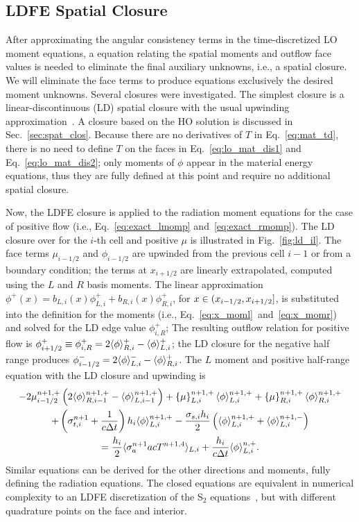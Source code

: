 \subsection{LDFE Spatial Closure}

After approximating the angular consistency terms in the time-discretized LO moment equations, 
a equation relating the spatial moments and outflow face values is
needed to eliminate the final auxiliary unknowns, i.e., a spatial closure.
We will eliminate the face terms to produce equations exclusively the desired moment
unknowns.  Several closures were investigated.  The simplest closure
is a linear-discontinuous (LD) spatial closure with the usual upwinding
approximation~\cite{morel_ldtrt}.  A closure based on the HO solution is discussed in
Sec.~\ref{sec:spat_clos}.  Because there are no derivatives of $T$ in Eq.~\eqref{eq:mat_td}, there is no need
to define $T$ on the faces in Eq.~\eqref{eq:lo_mat_dis1} and Eq.~\eqref{eq:lo_mat_dis2};
only moments of $\phi$ appear in the material energy
equations, thus they are fully defined at this point and require no additional spatial
closure.  

Now, the LDFE closure is applied to the radiation moment equations for the case of
positive flow (i.e., Eq.~\eqref{eq:exact_lmomp} and~\eqref{eq:exact_rmomp}). The LD
closure over for the $i$-th cell and positive $\mu$ 
is illustrated in Fig.~\ref{fig:ld_il}.  The face terms $\mu_{i-1/2}$ and $\phi_{i-1/2}$
are upwinded from the previous cell $i-1$ or from a boundary condition; the terms
at $x_{i+1/2}$ are linearly extrapolated, computed using the $L$ and $R$ basis
moments.  The linear approximation $\phi^+(x)=b_{L,i}(x)\phi^+_{L,i} +
b_{R,i}(x)\phi^+_{R,i}$, for $x\in({x_{i-1/2}},{x_{i+1/2}}]$, is substituted into the definition for
the moments (i.e., Eq.~\eqref{eq:x_moml}~and~\eqref{eq:x_momr}) and solved for the LD edge value
$\phi_{i,R}^+$; The resulting outflow relation for positive flow is $\phi^+_{i+1/2} \equiv \phi_{i,R}^+ = 2\langle \phi \rangle_{R,i}^+ -
\langle \phi \rangle_{L,i}^+$; the LD closure for the negative half range produces $\phi^-_{i-1/2} = 2\langle \phi \rangle_{L,i}^- -
\langle \phi \rangle_{R,i}^+$. The $L$ moment and positive half-range equation with the LD closure and upwinding is
\begin{multline} 
    -2{\mu}_{i-1/2}^{n+1,+} \left(2\langle \phi \rangle_{R,i-1}^{n+1,+} -   \langle \phi \rangle_{L,i-1}^{n+1,+}      \right) + \left\{ \mu \right\}_{L,i}^{n+1,+}
  \langle \phi \rangle_{L,i}^{n+1,+}
  +  \left\{ \mu \right\}_{R,i}^{n+1,+}
  \langle \phi \rangle_{R,i}^{n+1,+}\\ +  \left(\sigma_{t,i}^{n+1}+\frac{1}{c \Delta t} \right) h_i 
  \langle \phi \rangle_{L,i}^{n+1,+} -  \frac{\sigma_{s,i} h_i}{2} \left( \langle \phi \rangle_{L,i}^{n+1,+} +
  \langle \phi \rangle_{L,i}^{n+1,-}\right)\\  = \frac{h_i}{2} \langle \sigma_a^{n+1} a c T^{n+1,4} \rangle_{L,i} +
  \frac{h_i}{c\Delta t}\langle \phi \rangle_{L,i}^{n,+}.
\end{multline}
Similar equations can be derived for the other directions and moments, fully defining the radiation
equations.   The closed equations are equivalent in numerical complexity to an LDFE
discretization of the S$_2$ equations~\cite{morel_ldtrt,lewis}, but with different quadrature points on the face
and interior.

